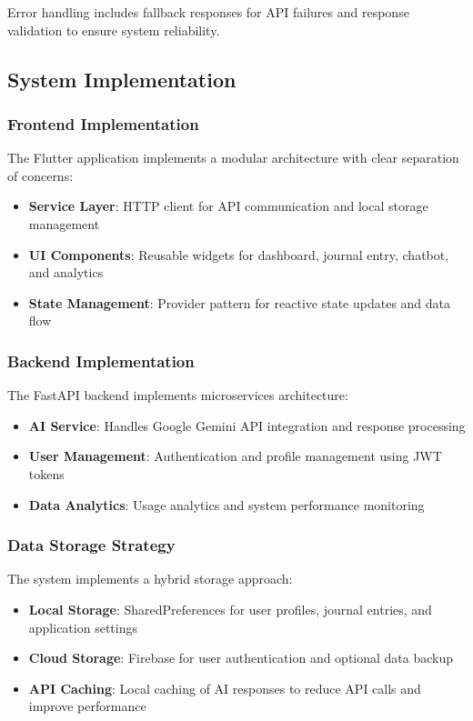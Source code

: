 \documentclass[conference,10pt]{IEEEtran}
\begin{document}
Error handling includes fallback responses for API failures and response validation to ensure system reliability.

\subsection{System Implementation}

\subsubsection{Frontend Implementation}

The Flutter application implements a modular architecture with clear separation of concerns:

\begin{itemize}
\item \textbf{Service Layer}: HTTP client for API communication and local storage management
\item \textbf{UI Components}: Reusable widgets for dashboard, journal entry, chatbot, and analytics
\item \textbf{State Management}: Provider pattern for reactive state updates and data flow
\end{itemize}

\subsubsection{Backend Implementation}

The FastAPI backend implements microservices architecture:

\begin{itemize}
\item \textbf{AI Service}: Handles Google Gemini API integration and response processing
\item \textbf{User Management}: Authentication and profile management using JWT tokens
\item \textbf{Data Analytics}: Usage analytics and system performance monitoring
\end{itemize}

\subsubsection{Data Storage Strategy}

The system implements a hybrid storage approach:

\begin{itemize}
\item \textbf{Local Storage}: SharedPreferences for user profiles, journal entries, and application settings
\item \textbf{Cloud Storage}: Firebase for user authentication and optional data backup
\item \textbf{API Caching}: Local caching of AI responses to reduce API calls and improve performance
\end{itemize}
\end{document}
